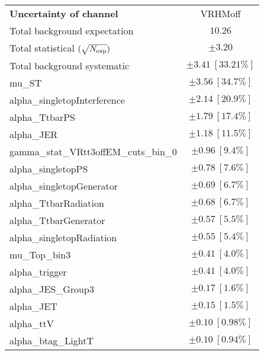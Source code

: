 
\begin{table}
\begin{center}
\setlength{\tabcolsep}{0.0pc}
\begin{tabular*}{\textwidth}{@{\extracolsep{\fill}}lc}
\noalign{\smallskip}\hline\noalign{\smallskip}
{\bf Uncertainty of channel}                                    & VRHMoff            \\
\noalign{\smallskip}\hline\noalign{\smallskip}
Total background expectation             &  $10.26$       \\
\noalign{\smallskip}\hline\noalign{\smallskip}
Total statistical $(\sqrt{N_{\rm exp}})$              & $\pm 3.20$       \\
Total background systematic               & $\pm 3.41\ [33.21\%] $             \\
\noalign{\smallskip}\hline\noalign{\smallskip}
\noalign{\smallskip}\hline\noalign{\smallskip}
mu\_ST         & $\pm 3.56\ [34.7\%] $       \\
alpha\_singletopInterference         & $\pm 2.14\ [20.9\%] $       \\
alpha\_TtbarPS         & $\pm 1.79\ [17.4\%] $       \\
alpha\_JER         & $\pm 1.18\ [11.5\%] $       \\
gamma\_stat\_VRtt3offEM\_cuts\_bin\_0         & $\pm 0.96\ [9.4\%] $       \\
alpha\_singletopPS         & $\pm 0.78\ [7.6\%] $       \\
alpha\_singletopGenerator         & $\pm 0.69\ [6.7\%] $       \\
alpha\_TtbarRadiation         & $\pm 0.68\ [6.7\%] $       \\
alpha\_TtbarGenerator         & $\pm 0.57\ [5.5\%] $       \\
alpha\_singletopRadiation         & $\pm 0.55\ [5.4\%] $       \\
mu\_Top\_bin3         & $\pm 0.41\ [4.0\%] $       \\
alpha\_trigger         & $\pm 0.41\ [4.0\%] $       \\
alpha\_JES\_Group3         & $\pm 0.17\ [1.6\%] $       \\
alpha\_JET         & $\pm 0.15\ [1.5\%] $       \\
alpha\_ttV         & $\pm 0.10\ [0.98\%] $       \\
alpha\_btag\_LightT         & $\pm 0.10\ [0.94\%] $       \\

\end{tabular*}
\end{center}
\end{table}
